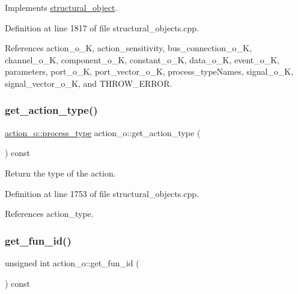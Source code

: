 Implements \hyperlink{classstructural__object_a3a8b2d38c2b5666700053a72868bb6b2}{structural\+\_\+object}.



Definition at line 1817 of file structural\+\_\+objects.\+cpp.



References action\+\_\+o\+\_\+K, action\+\_\+sensitivity, bus\+\_\+connection\+\_\+o\+\_\+K, channel\+\_\+o\+\_\+K, component\+\_\+o\+\_\+K, constant\+\_\+o\+\_\+K, data\+\_\+o\+\_\+K, event\+\_\+o\+\_\+K, parameters, port\+\_\+o\+\_\+K, port\+\_\+vector\+\_\+o\+\_\+K, process\+\_\+type\+Names, signal\+\_\+o\+\_\+K, signal\+\_\+vector\+\_\+o\+\_\+K, and T\+H\+R\+O\+W\+\_\+\+E\+R\+R\+OR.

\mbox{\label{classaction__o_a77ad99a2be1c8edde1c2ed30972ce528}} 
\subsubsection{\texorpdfstring{get\+\_\+action\+\_\+type()}{get\_action\_type()}}
{\footnotesize\ttfamily \hyperlink{classaction__o_a72fdfe1ad9ac24109fe11bb41153b87b}{action\+\_\+o\+::process\+\_\+type} action\+\_\+o\+::get\+\_\+action\+\_\+type (\begin{DoxyParamCaption}{ }\end{DoxyParamCaption}) const}



Return the type of the action. 



Definition at line 1753 of file structural\+\_\+objects.\+cpp.



References action\+\_\+type.

\mbox{\label{classaction__o_ac8514d6f3bbfa52b66b6ed8ad7021514}} 
\subsubsection{\texorpdfstring{get\+\_\+fun\+\_\+id()}{get\_fun\_id()}}
{\footnotesize\ttfamily unsigned int action\+\_\+o\+::get\+\_\+fun\+\_\+id (\begin{DoxyParamCaption}{ }\end{DoxyParamCaption}) const}



